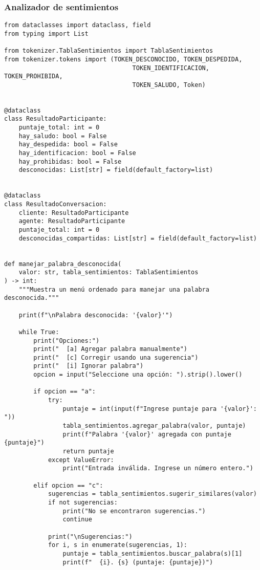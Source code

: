\subsubsection{Analizador de sentimientos}
\begin{lstlisting}
from dataclasses import dataclass, field
from typing import List

from tokenizer.TablaSentimientos import TablaSentimientos
from tokenizer.tokens import (TOKEN_DESCONOCIDO, TOKEN_DESPEDIDA,
                                   TOKEN_IDENTIFICACION, TOKEN_PROHIBIDA,
                                   TOKEN_SALUDO, Token)


@dataclass
class ResultadoParticipante:
    puntaje_total: int = 0
    hay_saludo: bool = False
    hay_despedida: bool = False
    hay_identificacion: bool = False
    hay_prohibidas: bool = False
    desconocidas: List[str] = field(default_factory=list)


@dataclass
class ResultadoConversacion:
    cliente: ResultadoParticipante
    agente: ResultadoParticipante
    puntaje_total: int = 0
    desconocidas_compartidas: List[str] = field(default_factory=list)


def manejar_palabra_desconocida(
    valor: str, tabla_sentimientos: TablaSentimientos
) -> int:
    """Muestra un menú ordenado para manejar una palabra desconocida."""

    print(f"\nPalabra desconocida: '{valor}'")

    while True:
        print("Opciones:")
        print("  [a] Agregar palabra manualmente")
        print("  [c] Corregir usando una sugerencia")
        print("  [i] Ignorar palabra")
        opcion = input("Seleccione una opción: ").strip().lower()

        if opcion == "a":
            try:
                puntaje = int(input(f"Ingrese puntaje para '{valor}': "))
                tabla_sentimientos.agregar_palabra(valor, puntaje)
                print(f"Palabra '{valor}' agregada con puntaje {puntaje}")
                return puntaje
            except ValueError:
                print("Entrada inválida. Ingrese un número entero.")

        elif opcion == "c":
            sugerencias = tabla_sentimientos.sugerir_similares(valor)
            if not sugerencias:
                print("No se encontraron sugerencias.")
                continue

            print("\nSugerencias:")
            for i, s in enumerate(sugerencias, 1):
                puntaje = tabla_sentimientos.buscar_palabra(s)[1]
                print(f"  {i}. {s} (puntaje: {puntaje})")


\end{lstlisting}
